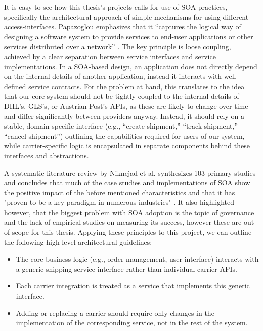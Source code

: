 \documentclass{imc-inf}
\begin{document}
It is easy to see how this thesis's projects calls for use of SOA practices, specifically the architectural approach of simple mechanisms for using different access-interfaces.
Papazoglou emphasizes that it “captures the logical way of designing a software system to provide services to end-user applications or other services distributed over a network” \cite{papazoglouServiceOrientedArchitectures2007}.
The key principle is loose coupling, achieved by a clear separation between service interfaces and service implementations.
In a SOA-based design, an application does not directly depend on the internal details of another application, instead it interacts with well-defined service contracts.
For the problem at hand, this translates to the idea that our core system should not be tightly coupled to the internal details of DHL's, GLS's, or Austrian Post's APIs, as these are likely to change over time and differ significantly between providers anyway.
Instead, it should rely on a stable, domain-specific interface (e.g., “create shipment,” “track shipment,” “cancel shipment”) outlining the capabilities required for users of our system, while carrier-specific logic is encapsulated in separate components behind these interfaces and abstractions.

A systematic literature review by Niknejad et al. synthesizes 103 primary studies and concludes that much of the case studies and implementations of SOA show the positive impact of the before mentioned characteristics and that it has "proven to be a key paradigm in numerous industries" \cite{niknejadUnderstandingServiceOrientedArchitecture2020}.
It also highlighted however, that the biggest problem with SOA adoption is the topic of governance and the lack of empirical studies on measuring its success, however these are out of scope for this thesis.
Applying these principles to this project, we can outline the following high-level architectural guidelines:

\begin{itemize}[itemsep=3pt]
  \item The core business logic (e.g., order management, user interface) interacts with a generic shipping service interface rather than individual carrier APIs.
  \item Each carrier integration is treated as a service that implements this generic interface.
  \item Adding or replacing a carrier should require only changes in the implementation of the corresponding service, not in the rest of the system.
\end{itemize}
\end{document}
